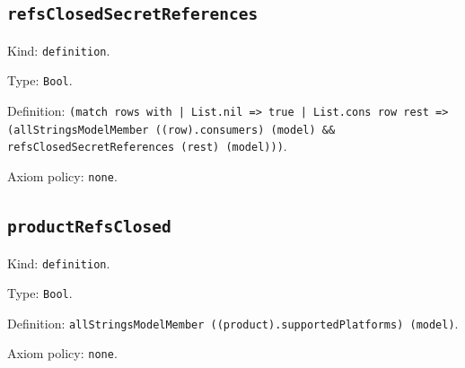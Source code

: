 \documentclass[11pt]{article}
\begin{document}
\subsection*{\texttt{refsClosedSecretReferences}}
\noindent Kind: \texttt{definition}.\par
\noindent Type: \texttt{Bool}.\par
\noindent Definition: \texttt{(match rows with | List.nil => true | List.cons row rest => (allStringsModelMember ((row).consumers) (model) \&\& refsClosedSecretReferences (rest) (model)))}.\par
\noindent Axiom policy: \texttt{none}.\par
\subsection*{\texttt{productRefsClosed}}
\noindent Kind: \texttt{definition}.\par
\noindent Type: \texttt{Bool}.\par
\noindent Definition: \texttt{allStringsModelMember ((product).supportedPlatforms) (model)}.\par
\noindent Axiom policy: \texttt{none}.\par
\end{document}
